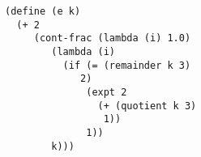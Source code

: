\documentclass[a4paper,12pt]{article}
\begin{document}
\begin{lstlisting}
(define (e k)
  (+ 2
     (cont-frac (lambda (i) 1.0)
		(lambda (i)
		  (if (= (remainder k 3)
			 2)
		      (expt 2
			    (+ (quotient k 3)
				 1))
		      1))
		k)))
\end{lstlisting}
\end{document}
